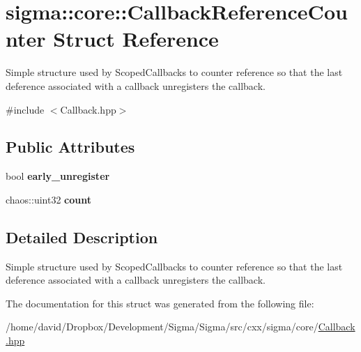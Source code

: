 \hypertarget{structsigma_1_1core_1_1_callback_reference_counter}{\section{sigma\-:\-:core\-:\-:Callback\-Reference\-Counter Struct Reference}
\label{structsigma_1_1core_1_1_callback_reference_counter}
}


Simple structure used by Scoped\-Callbacks to counter reference so that the last deference associated with a callback unregisters the callback.  




{\ttfamily \#include $<$Callback.\-hpp$>$}

\subsection*{Public Attributes}
\begin{DoxyCompactItemize}
\item 
\hypertarget{structsigma_1_1core_1_1_callback_reference_counter_af26624ae7bdcc423c4e01375491c23c4}{bool {\bfseries early\-\_\-unregister}}\label{structsigma_1_1core_1_1_callback_reference_counter_af26624ae7bdcc423c4e01375491c23c4}

\item 
\hypertarget{structsigma_1_1core_1_1_callback_reference_counter_ac5291eebd3bbfca110b9c68ab9028efc}{chaos\-::uint32 {\bfseries count}}\label{structsigma_1_1core_1_1_callback_reference_counter_ac5291eebd3bbfca110b9c68ab9028efc}

\end{DoxyCompactItemize}


\subsection{Detailed Description}
Simple structure used by Scoped\-Callbacks to counter reference so that the last deference associated with a callback unregisters the callback. 

The documentation for this struct was generated from the following file\-:\begin{DoxyCompactItemize}
\item 
/home/david/\-Dropbox/\-Development/\-Sigma/\-Sigma/src/cxx/sigma/core/\hyperlink{_callback_8hpp}{Callback.\-hpp}\end{DoxyCompactItemize}

